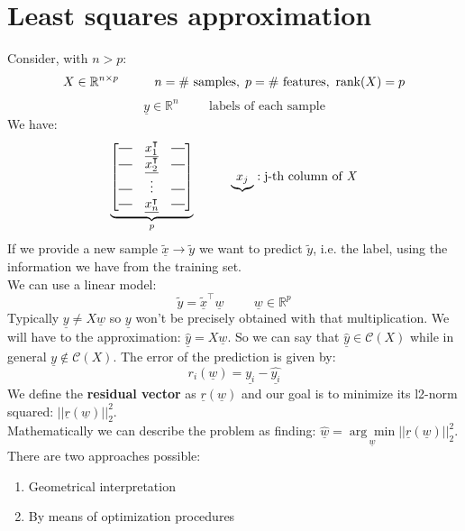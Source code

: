 \section{Least squares approximation}
Consider, with $n > p$: 
\[
    X \in \mathbb{R}^{n \times p} \hspace{1cm} n = \text{\# samples}, \hspace{0.1cm} p = \text{\# features}, \text{ rank(}X\text{)} = p   
\]
\[
    \underline{y} \in \mathbb{R}^n \hspace{1cm} \text{labels of each sample}    
\]
We have:
\[
\underbrace{
\begin{bmatrix}
    \horzbar & \underline{x_1^\intercal} & \horzbar\\
    \horzbar & \underline{x_2^\intercal} & \horzbar\\    
    \horzbar & \vdots & \horzbar\\
    \horzbar & \underline{x_n^\intercal} & \horzbar
\end{bmatrix}}_{p}
\hspace{1cm}
\underbrace{x_j}: \text{j-th column of \emph{X}}
\]
If we provide a new sample $\tilde{\underline{x}} \rightarrow \tilde{y}$ we want to predict $\tilde{y}$, i.e. the label, using the information we have from the training set.\\
We can use a linear model:
\[
    \tilde{y} = \tilde{\underline{x}}^\intercal \underline{w} \hspace{1cm} \underline{w} \in \mathbb{R}^p
\]
Typically $\underline{y} \neq X\underline{w}$ so $\underline{y}$ won't be precisely obtained with that multiplication. We will have to the approximation: $\hat{\underline{y}} = X\underline{w}$. So we can say that $\hat{\underline{y}} \in \mathcal{C}(X)$ while in general $\underline{y} \notin \mathcal{C}(X)$.
The error of the prediction is given by:
\[
    r_i(\underline{w}) = \underline{y_i} - \underline{\hat{y_i}}    
\] 
We define the \textbf{residual vector} as $\underline{r}(\underline{w})$ and our goal is to minimize its l2-norm squared: $||\underline{r}(\underline{w})||^2_2$.\\

Mathematically we can describe the problem as finding: $\hat{\underline{w}} = \underset{\underline{w}}{\arg\min}||\underline{r}(\underline{w})||^2_2$. There are two approaches possible:
\begin{enumerate}
    \item Geometrical interpretation
    \item By means of optimization procedures
\end{enumerate}
